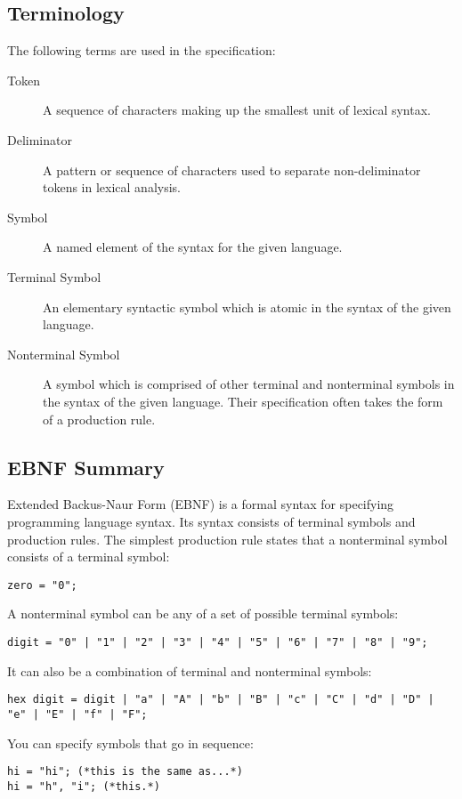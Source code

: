 \documentclass[10pt,a4paper]{article}
\begin{document}
\subsection{Terminology}
The following terms are used in the specification:
\begin{description}
\item[Token] A sequence of characters making up the smallest unit of lexical syntax.
\item[Deliminator] A pattern or sequence of characters used to separate non-deliminator tokens in lexical analysis.
\item[Symbol] A named element of the syntax for the given language. 
\item[Terminal Symbol] An elementary syntactic symbol which is atomic in the syntax of the given language.
\item[Nonterminal Symbol] A symbol which is comprised of other terminal and nonterminal symbols in the syntax of the given language. Their specification often takes the form of a production rule.
\end{description}

\subsection{EBNF Summary}
\label{sec:EBNFSummary}
Extended Backus-Naur Form (EBNF) is a formal syntax for specifying programming language syntax. Its syntax consists of terminal symbols and production rules. The simplest production rule states that a nonterminal symbol consists of a terminal symbol:
\begin{verbatim}
zero = "0";
\end{verbatim}

A nonterminal symbol can be any of a set of possible terminal symbols:
\begin{verbatim}
digit = "0" | "1" | "2" | "3" | "4" | "5" | "6" | "7" | "8" | "9";
\end{verbatim}

It can also be a combination of terminal and nonterminal symbols:
\begin{verbatim}
hex digit = digit | "a" | "A" | "b" | "B" | "c" | "C" | "d" | "D" | "e" | "E" | "f" | "F";
\end{verbatim}

You can specify symbols that go in sequence:
\begin{verbatim}
hi = "hi"; (*this is the same as...*)
hi = "h", "i"; (*this.*)
\end{verbatim}
\end{document}
